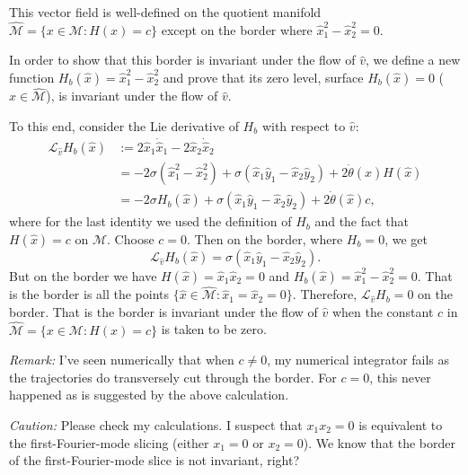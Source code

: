 \begin{description}
{This vector field is well-defined on the quotient manifold $\hat{\mathcal
M}=\{x\in\mathcal M: H(x)=c\}$ except on the border where $\hat x_1^2-\hat x_2^2=0$.

In order to show that this border is invariant under the flow of $\hat v$, we
define a new function $H_b(\hat x)=\hat x_1^2-\hat x_2^2$ and prove that its zero level,
surface $H_b(\hat x)=0$ ($\hat x\in\hat{\mathcal M}$), is invariant under the flow of
$\hat v$.

To this end, consider the Lie derivative of $H_b$ with respect to $\hat v$:
\begin{align}
\mathcal L_{\hat v}H_b(\hat x) &:= 2\hat x_1\dot {\hat x}_1-2\hat x_2\dot{\hat
x}_2\nonumber\\
 &=-2\sigma(\hat x_1^2-\hat x_2^2)+\sigma(\hat x_1\hat y_1-\hat x_2\hat
 y_2)+2\dot{\theta}(\hat x)H(\hat x)\nonumber\\
 &=-2\sigma H_b(\hat x)+\sigma(\hat x_1\hat y_1-\hat x_2\hat
 y_2)+2\dot{\theta}(\hat x)c,
 \label{eq:LieDer_border}
\end{align}
where for the last identity we used the definition of $H_b$ and the fact that $H(\hat
x)=c$ on $\hat{\mathcal M}$. Choose $c=0$. Then on the border, where $H_b=0$, we get
$$\mathcal L_{\hat v}H_b(\hat x)=\sigma(\hat x_1\hat y_1-\hat x_2\hat
y_2).$$
But on the border we have $H(\hat x)=\hat x_1\hat x_2=0$ and $H_b(\hat x)=\hat x_1^2-\hat
x_2^2=0$. That is the border is all the points $\{\hat x\in\hat{\mathcal M}: \hat
x_1=\hat x_2=0 \}$. Therefore, $\mathcal L_{\hat v}H_b=0$ on the border. That is
the border is invariant under the flow of $\hat v$ when the constant $c$ in
$\hat{\mathcal M}=\{x\in\mathcal M: H(x)=c\}$ is taken to be zero.

\emph{Remark:} I've seen numerically that when $c\neq 0$, my numerical integrator fails
as the trajectories do transversely cut through the border. For $c=0$, this never
happened as is suggested by the above calculation.

\emph{Caution:} Please check my calculations. I suspect that
$x_1x_2=0$ is equivalent to the first-Fourier-mode slicing (either $x_1=0$ or $x_2=0$).
We know that the border of the first-Fourier-mode slice is not invariant, right?
}

\end{description}
